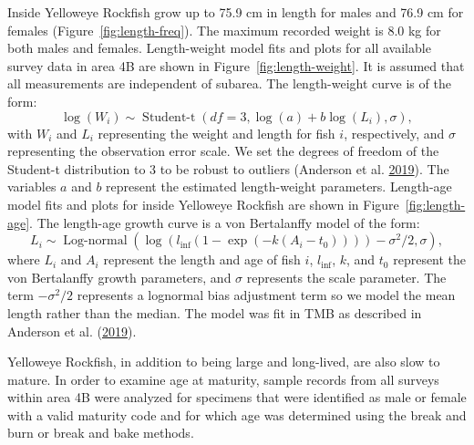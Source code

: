 \documentclass[11pt]{book}
\begin{document}
Inside Yelloweye Rockfish grow up to 75.9 cm in length for males and 76.9 cm for females (Figure~\ref{fig:length-freq}). The maximum recorded weight is 8.0 kg for both males and females. Length-weight model fits and plots for all available survey data in area 4B are shown in Figure~\ref{fig:length-weight}. It is assumed that all measurements are independent of subarea. The length-weight curve is of the form:
\begin{equation}
\log (W_i) \sim \operatorname{Student-t}(df = 3, \log(a) + b \log(L_i), \sigma),
\end{equation}
with \(W_i\) and \(L_i\) representing the weight and length for fish \(i\), respectively, and \(\sigma\) representing the observation error scale. We set the degrees of freedom of the Student-t distribution to 3 to be robust to outliers (Anderson et al. \protect\hyperlink{ref-anderson2019synopsis}{2019}). The variables \(a\) and \(b\) represent the estimated length-weight parameters. Length-age model fits and plots for inside Yelloweye Rockfish are shown in Figure~\ref{fig:length-age}. The length-age growth curve is a von Bertalanffy model of the form:
\begin{equation}
L_i \sim \operatorname{Log-normal}
\left( \log(l_\mathrm{inf} (1 - \exp(-k (A_i - t_0)))) -
\sigma^2 / 2, \sigma \right),
\end{equation}
where \(L_i\) and \(A_i\) represent the length and age of fish \(i\), \(l_\mathrm{inf}\), \(k\), and \(t_0\) represent the von Bertalanffy growth parameters, and \(\sigma\) represents the scale parameter. The term \(- \sigma^2 /2\) represents a lognormal bias adjustment term so we model the mean length rather than the median. The model was fit in TMB as described in Anderson et al. (\protect\hyperlink{ref-anderson2019synopsis}{2019}).

\hypertarget{sec:maturity}{%
\label{sec:maturity}}

Yelloweye Rockfish, in addition to being large and long-lived, are also slow to mature. In order to examine age at maturity, sample records from all surveys within area 4B were analyzed for specimens that were identified as male or female with a valid maturity code and for which age was determined using the break and burn or break and bake methods.
\end{document}

